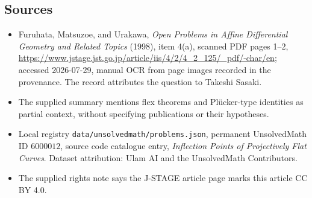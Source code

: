 \documentclass[11pt]{article}
\begin{document}
\subsection{Sources}
\begin{itemize}
\item Furuhata, Matsuzoe, and Urakawa, \emph{Open Problems in Affine Differential Geometry and Related Topics} (1998), item 4(a), scanned PDF pages 1--2, \url{https://www.jstage.jst.go.jp/article/iis/4/2/4_2_125/_pdf/-char/en}; accessed 2026-07-29, manual OCR from page images recorded in the provenance. The record attributes the question to Takeshi Sasaki.
\item The supplied summary mentions flex theorems and Pl\"ucker-type identities as partial context, without specifying publications or their hypotheses.
\item Local registry \texttt{data/unsolvedmath/problems.json}, permanent UnsolvedMath ID $6000012$, source code catalogue entry, \emph{Inflection Points of Projectively Flat Curves}. Dataset attribution: Ulam AI and the UnsolvedMath Contributors.
\item The supplied rights note says the J-STAGE article page marks this article CC BY 4.0.
\end{itemize}
\end{document}
